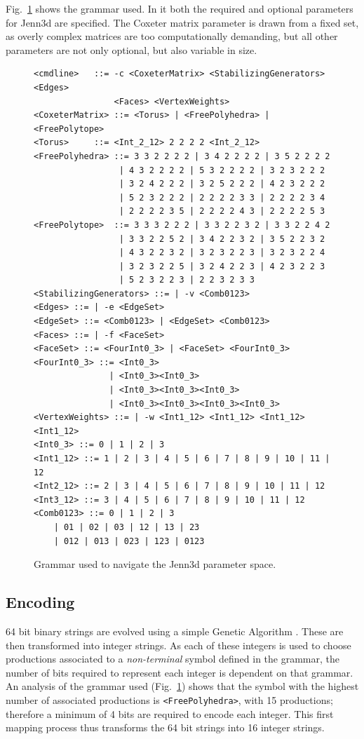 \documentclass{article}
\begin{document}
Fig.~\ref{grammar} shows the grammar used. In it both the required and optional
parameters for Jenn3d are specified. The Coxeter matrix parameter is drawn from
a fixed set, as overly complex matrices are too computationally demanding, but
all other parameters are not only optional, but also variable in size.

\begin{figure}[h!t]
	\begin{verbatim}
<cmdline>	::= -c <CoxeterMatrix> <StabilizingGenerators> <Edges>
                <Faces> <VertexWeights>
<CoxeterMatrix>	::= <Torus> | <FreePolyhedra> | <FreePolytope>
<Torus>		::= <Int_2_12> 2 2 2 2 <Int_2_12>
<FreePolyhedra>	::= 3 3 2 2 2 2 | 3 4 2 2 2 2 | 3 5 2 2 2 2
                 | 4 3 2 2 2 2 | 5 3 2 2 2 2 | 3 2 3 2 2 2
                 | 3 2 4 2 2 2 | 3 2 5 2 2 2 | 4 2 3 2 2 2
                 | 5 2 3 2 2 2 | 2 2 2 2 3 3 | 2 2 2 2 3 4
                 | 2 2 2 2 3 5 | 2 2 2 2 4 3 | 2 2 2 2 5 3
<FreePolytope>	::= 3 3 3 2 2 2 | 3 3 2 2 3 2 | 3 3 2 2 4 2
                 | 3 3 2 2 5 2 | 3 4 2 2 3 2 | 3 5 2 2 3 2
                 | 4 3 2 2 3 2 | 3 2 3 2 2 3 | 3 2 3 2 2 4
                 | 3 2 3 2 2 5 | 3 2 4 2 2 3 | 4 2 3 2 2 3
                 | 5 2 3 2 2 3 | 2 2 3 2 3 3
<StabilizingGenerators> ::= | -v <Comb0123>
<Edges> ::= | -e <EdgeSet>
<EdgeSet> ::= <Comb0123> | <EdgeSet> <Comb0123>
<Faces> ::= | -f <FaceSet>
<FaceSet> ::= <FourInt0_3> | <FaceSet> <FourInt0_3>
<FourInt0_3> ::= <Int0_3>
               | <Int0_3><Int0_3>
               | <Int0_3><Int0_3><Int0_3>
               | <Int0_3><Int0_3><Int0_3><Int0_3>
<VertexWeights> ::= | -w <Int1_12> <Int1_12> <Int1_12> <Int1_12>
<Int0_3> ::= 0 | 1 | 2 | 3
<Int1_12> ::= 1 | 2 | 3 | 4 | 5 | 6 | 7 | 8 | 9 | 10 | 11 | 12
<Int2_12> ::= 2 | 3 | 4 | 5 | 6 | 7 | 8 | 9 | 10 | 11 | 12
<Int3_12> ::= 3 | 4 | 5 | 6 | 7 | 8 | 9 | 10 | 11 | 12
<Comb0123> ::= 0 | 1 | 2 | 3
	| 01 | 02 | 03 | 12 | 13 | 23
	| 012 | 013 | 023 | 123 | 0123
	\end{verbatim}
	\caption{Grammar used to navigate the Jenn3d parameter space.}
	\label{grammar}
\end{figure}

\subsection{Encoding}

64 bit binary strings are evolved using a simple Genetic Algorithm
\cite{holland75}. These are then transformed into integer strings. As each of
these integers is used to choose productions associated to a
\textit{non-terminal} symbol defined in the grammar, the number of bits required to
represent each integer is dependent on that grammar. An analysis of the
grammar used (Fig.~\ref{grammar}) shows that the symbol with the highest number
of associated productions is \texttt{<FreePolyhedra>}, with 15 productions;
therefore a minimum of 4 bits are required to encode each integer. This first
mapping process thus transforms the 64 bit strings into 16 integer strings.
\end{document}
